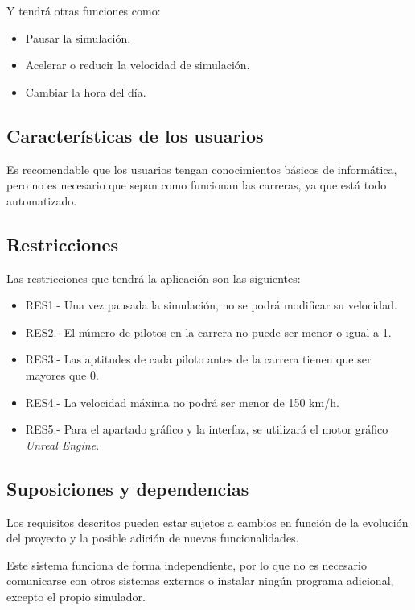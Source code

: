 Y tendrá otras funciones como:

\begin{itemize}
    \item Pausar la simulación.
    \item Acelerar o reducir la velocidad de simulación.
    \item Cambiar la hora del día.
\end{itemize}

\subsection{Características de los usuarios}

Es recomendable que los usuarios tengan conocimientos básicos de informática, pero no es necesario que sepan como funcionan las carreras, ya que está todo automatizado. 

\subsection{Restricciones}

Las restricciones que tendrá la aplicación son las siguientes:

\begin{itemize}
    \item RES1.- Una vez pausada la simulación, no se podrá modificar su velocidad.
    \item RES2.- El número de pilotos en la carrera no puede ser menor o igual a 1.
    \item RES3.- Las aptitudes de cada piloto antes de la carrera tienen que ser mayores que 0.
    \item RES4.- La velocidad máxima no podrá ser menor de 150 km/h.
    \item RES5.- Para el apartado gráfico y la interfaz, se utilizará el motor gráfico \textit{Unreal Engine}.
\end{itemize}

\subsection{Suposiciones y dependencias}

Los requisitos descritos pueden estar sujetos a cambios en función de la evolución del proyecto y la posible adición de nuevas funcionalidades. 

\bigskip

Este sistema funciona de forma independiente, por lo que no es necesario comunicarse con otros sistemas externos o instalar ningún programa adicional, excepto el propio simulador.

